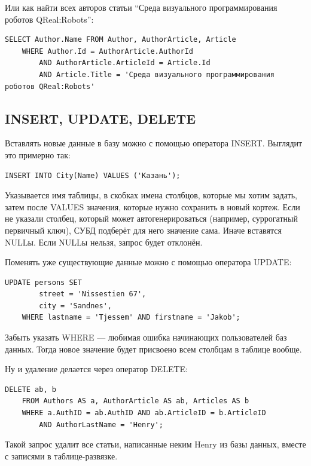 \documentclass{../../text-style}
\begin{document}
Или как найти всех авторов статьи ``Среда визуального программирования роботов QReal:Robots'':

\begin{verbatim}
SELECT Author.Name FROM Author, AuthorArticle, Article 
    WHERE Author.Id = AuthorArticle.AuthorId 
        AND AuthorArticle.ArticleId = Article.Id 
        AND Article.Title = 'Среда визуального программирования роботов QReal:Robots'
\end{verbatim}

\subsection{INSERT, UPDATE, DELETE}

Вставлять новые данные в базу можно с помощью оператора INSERT. Выглядит это примерно так:

\begin{verbatim}
INSERT INTO City(Name) VALUES ('Казань');
\end{verbatim}

Указывается имя таблицы, в скобках имена столбцов, которые мы хотим задать, затем после VALUES значения, которые нужно сохранить в новый кортеж. Если не указали столбец, который может автогенерироваться (например, суррогатный первичный ключ), СУБД подберёт для него значение сама. Иначе вставятся NULLы. Если NULLы нельзя, запрос будет отклонён.

Поменять уже существующие данные можно с помощью оператора UPDATE:

\begin{verbatim}
UPDATE persons SET
        street = 'Nissestien 67',
        city = 'Sandnes',
    WHERE lastname = 'Tjessem' AND firstname = 'Jakob';
\end{verbatim}

Забыть указать WHERE --- любимая ошибка начинающих пользователей баз данных. Тогда новое значение будет присвоено всем столбцам в таблице вообще.

Ну и удаление делается через оператор DELETE:

\begin{verbatim}
DELETE ab, b
    FROM Authors AS a, AuthorArticle AS ab, Articles AS b
    WHERE a.AuthID = ab.AuthID AND ab.ArticleID = b.ArticleID
        AND AuthorLastName = 'Henry';
\end{verbatim}

Такой запрос удалит все статьи, написанные неким Henry из базы данных, вместе с записями в таблице-развязке.
\end{document}
